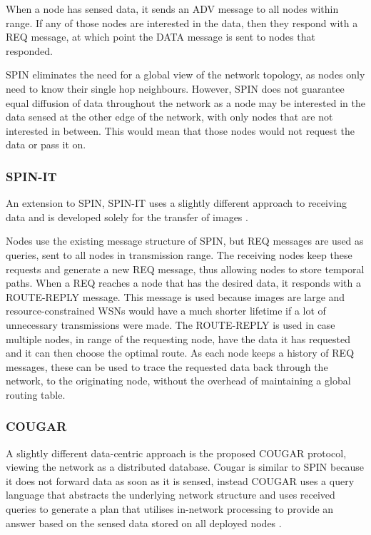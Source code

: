 When a node has sensed data, it sends an ADV message to all nodes within range. If any of those nodes are interested in the data, then they respond with a REQ message, at which point the DATA message is sent to nodes that responded.

SPIN eliminates the need for a global view of the network topology, as nodes only need to know their single hop neighbours. However, SPIN does not guarantee equal diffusion of data throughout the network as a node may be interested in the data sensed at the other edge of the network, with only nodes that are not interested in between. This would mean that those nodes would not request the data or pass it on.

\subsubsection{SPIN-IT}
	An extension to SPIN, SPIN-IT  uses a slightly different approach to receiving data and is developed solely for the transfer of images \cite{Woodrow2002}.
	
Nodes use the existing message structure of SPIN, but REQ messages are used as queries, sent to all nodes in transmission range. The receiving nodes keep these requests and generate a new REQ message, thus allowing nodes to store temporal paths. When a REQ reaches a node that has the desired data, it responds with a ROUTE-REPLY message. This message is used because images are large and resource-constrained WSNs would have a much shorter lifetime if a lot of unnecessary transmissions were made. The ROUTE-REPLY is used in case multiple nodes, in range of the requesting node, have the data it has requested and it can then choose the optimal route. As each node keeps a history of REQ messages, these can be used to trace the requested data back through the network, to the originating node, without the overhead of maintaining a global routing table.

\subsubsection{COUGAR}
	A slightly different data-centric approach is the proposed COUGAR protocol, viewing the network as a distributed database. Cougar is similar to SPIN because it does not forward data as soon as it is sensed, instead COUGAR uses a query language that abstracts the underlying network structure and uses received queries to generate a plan that utilises in-network processing to provide an answer based on the sensed data stored on all deployed nodes \cite{Yao2002}.

